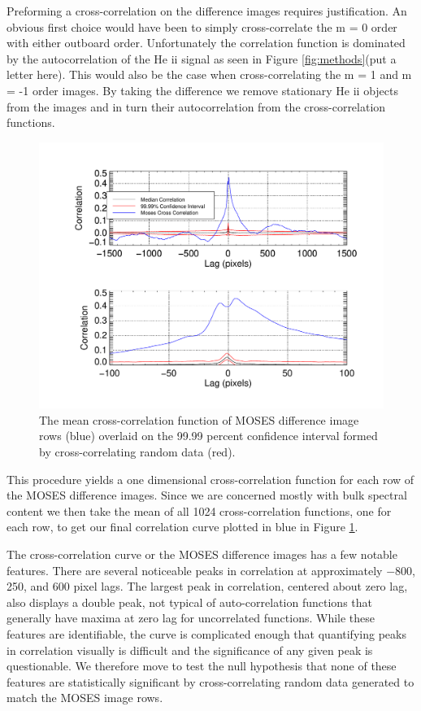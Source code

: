 \documentclass[]{solarphysics}
\begin{document}
\begin{article}
 	Preforming a cross-correlation on the difference images requires justification.  An obvious first choice would have been to simply cross-correlate the m = 0 order with either outboard order.  Unfortunately the correlation function is dominated by the autocorrelation of the He {\sc ii} signal as seen in Figure \ref{fig:methods}(put a letter here).  This would also be the case when cross-correlating the m = 1 and m = -1 order images.  By taking the difference we remove stationary He {\sc ii} objects from the images and in turn their autocorrelation from the cross-correlation functions.
 	
			 	
		\begin{figure}
		\centering
		\includegraphics[width=\linewidth]{images/sigtest_5}
		\caption{The mean cross-correlation function of MOSES difference image rows (blue) overlaid on the 99.99 percent confidence interval formed by cross-correlating random data (red). }
		\label{fig:sigtest}
		\end{figure}
 	
	 This procedure yields a one dimensional cross-correlation function for each row of the MOSES difference images.  Since we are concerned mostly with bulk spectral content we then take the mean of all 1024 cross-correlation functions, one for each row, to get our final correlation curve plotted in blue in Figure \ref{fig:sigtest}. 
	 
	 The cross-correlation curve or the MOSES difference images has a few notable features.  There are several noticeable peaks in correlation  at approximately $-800$, 250, and 600 pixel lags.  The largest peak in correlation, centered about zero lag, also displays a double peak, not typical of auto-correlation functions that generally have  maxima at zero lag for uncorrelated functions.  While these features are identifiable, the curve is complicated enough that quantifying peaks in correlation visually is difficult and the significance of any given peak is questionable. We therefore move to test the null hypothesis that none of these features are statistically significant by cross-correlating random data generated to match the MOSES image rows.
 

\end{article}
\end{document}
